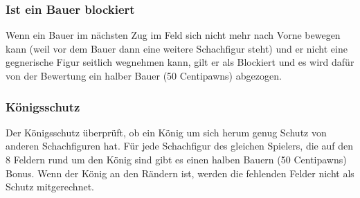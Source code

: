 \subsubsection{Ist ein Bauer blockiert}
Wenn ein Bauer im nächsten Zug im Feld sich nicht mehr nach Vorne bewegen kann (weil vor dem Bauer dann eine weitere Schachfigur steht) und er nicht eine gegnerische Figur seitlich wegnehmen kann, gilt er als Blockiert und es wird dafür von der Bewertung ein halber Bauer (50 Centipawns) abgezogen.

\subsubsection{Königsschutz}
Der Königsschutz überprüft, ob ein König um sich herum genug Schutz von anderen Schachfiguren hat.\newline
F\"ur jede Schachfigur des gleichen Spielers, die auf den 8 Feldern rund um den K\"onig sind gibt es einen halben Bauern (50 Centipawns) Bonus. Wenn der K\"onig an den R\"andern ist, werden die fehlenden Felder nicht als Schutz mitgerechnet.
